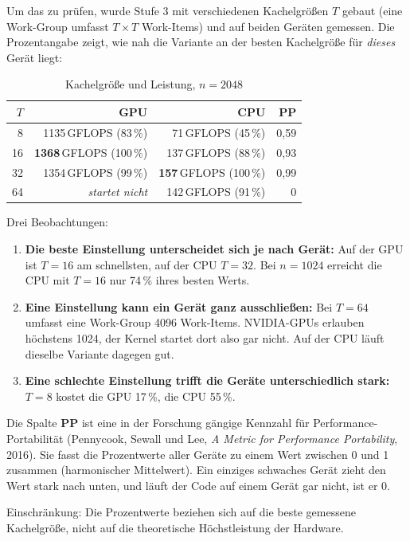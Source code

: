 \documentclass[11pt]{article}
\begin{document}
Um das zu prüfen, wurde Stufe 3 mit verschiedenen Kachelgrößen $T$ gebaut
(eine Work-Group umfasst $T \times T$ Work-Items) und auf beiden Geräten
gemessen. Die Prozentangabe zeigt, wie nah die Variante an der besten
Kachelgröße für \emph{dieses} Gerät liegt:

\begin{table}[h]
\centering
\begin{tabular}{@{}rrrr@{}}
\toprule
$T$ & \textbf{GPU} & \textbf{CPU} & \textbf{PP} \\
\midrule
8  & 1135\,GFLOPS (83\,\%) & 71\,GFLOPS (45\,\%) & 0{,}59 \\
16 & \textbf{1368}\,GFLOPS (100\,\%) & 137\,GFLOPS (88\,\%) & 0{,}93 \\
32 & 1354\,GFLOPS (99\,\%) & \textbf{157}\,GFLOPS (100\,\%) & 0{,}99 \\
64 & \emph{startet nicht} & 142\,GFLOPS (91\,\%) & 0 \\
\bottomrule
\end{tabular}
\caption{Kachelgröße und Leistung, $n = 2048$}
\end{table}

Drei Beobachtungen:
\begin{enumerate}
    \item \textbf{Die beste Einstellung unterscheidet sich je nach
    Gerät:} Auf der GPU ist $T = 16$ am schnellsten, auf der CPU $T = 32$.
    Bei $n = 1024$ erreicht die CPU mit $T = 16$ nur 74\,\% ihres
    besten Werts.
    \item \textbf{Eine Einstellung kann ein Gerät ganz ausschließen:} Bei
    $T = 64$ umfasst eine Work-Group 4096 Work-Items. NVIDIA-GPUs erlauben
    höchstens 1024, der Kernel startet dort also gar nicht. Auf der CPU
    läuft dieselbe Variante dagegen gut.
    \item \textbf{Eine schlechte Einstellung trifft die Geräte
    unterschiedlich stark:} $T = 8$ kostet die GPU 17\,\%, die CPU 55\,\%.
\end{enumerate}

Die Spalte \textbf{PP} ist eine in der Forschung gängige Kennzahl für
Performance-Portabilität (Pennycook, Sewall und Lee, \emph{A Metric for
Performance Portability}, 2016). Sie fasst die Prozentwerte aller Geräte
zu einem Wert zwischen 0 und 1 zusammen (harmonischer Mittelwert). Ein
einziges schwaches Gerät zieht den Wert stark nach unten, und läuft der
Code auf einem Gerät gar nicht, ist er 0.

Einschränkung: Die Prozentwerte beziehen sich auf die beste gemessene
Kachelgröße, nicht auf die theoretische Höchstleistung der Hardware.
\end{document}
